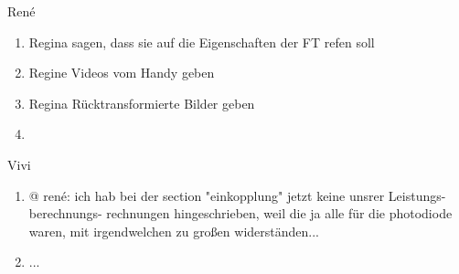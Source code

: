 
René
\begin{enumerate}
	\item Regina sagen, dass sie auf die Eigenschaften der FT refen soll
	\item Regine Videos vom Handy geben
	\item Regina Rücktransformierte Bilder geben
	\item 
\end{enumerate}

Vivi
\begin{enumerate}
	\item @ rené: ich hab bei der section "einkopplung" jetzt keine unsrer Leistungs-berechnungs- rechnungen hingeschrieben, weil die ja alle für die photodiode waren, mit irgendwelchen zu großen widerständen... 
	\item ...
\end{enumerate}